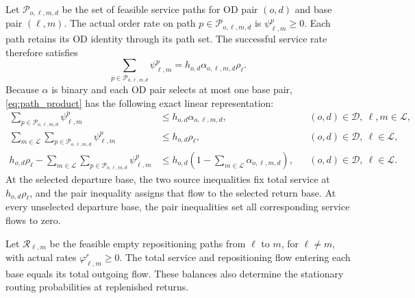 \documentclass[final,3p,authoryear]{elsarticle}
\begin{document}
Let $\mathcal P_{o,\ell,m,d}$ be the set of feasible service paths for OD pair $(o,d)$ and base pair $(\ell,m)$.
The actual order rate on path $p\in\mathcal P_{o,\ell,m,d}$ is $\psi_{\ell,m}^{p}\ge0$.
Each path retains its OD identity through its path set.
The successful service rate therefore satisfies
\begin{equation}
 \sum_{p\in\mathcal P_{o,\ell,m,d}}\psi_{\ell,m}^{p}
 =h_{o,d}\alpha_{o,\ell,m,d}\rho_\ell.
 \label{eq:path_product}
\end{equation}
Because $\alpha$ is binary and each OD pair selects at most one base pair, \eqref{eq:path_product} has the following exact linear representation:
\begin{subequations}\label{eq:path_linearization}
\begin{align}
 \sum_{p\in\mathcal P_{o,\ell,m,d}}\psi_{\ell,m}^{p}
 &\le h_{o,d}\alpha_{o,\ell,m,d},
 &&(o,d)\in\mathcal D,\ \ell,m\in\mathcal L,\label{eq:path_pair}\\
 \sum_{m\in\mathcal L}\sum_{p\in\mathcal P_{o,\ell,m,d}}\psi_{\ell,m}^{p}
 &\le h_{o,d}\rho_\ell,
 &&(o,d)\in\mathcal D,\ \ell\in\mathcal L,\label{eq:path_source_upper}\\
 h_{o,d}\rho_\ell-
 \sum_{m\in\mathcal L}\sum_{p\in\mathcal P_{o,\ell,m,d}}\psi_{\ell,m}^{p}
 &\le h_{o,d}\left(1-\sum_{m\in\mathcal L}\alpha_{o,\ell,m,d}\right),
 &&(o,d)\in\mathcal D,\ \ell\in\mathcal L.\label{eq:path_source_lower}
\end{align}
\end{subequations}
At the selected departure base, the two source inequalities fix total service at $h_{o,d}\rho_\ell$, and the pair inequality assigns that flow to the selected return base.
At every unselected departure base, the pair inequalities set all corresponding service flows to zero.

Let $\mathcal R_{\ell,m}$ be the feasible empty repositioning paths from $\ell$ to $m$, for $\ell\ne m$, with actual rates $\varphi_{\ell,m}^{r}\ge0$.
The total service and repositioning flow entering each base equals its total outgoing flow.
These balances also determine the stationary routing probabilities at replenished returns.
\end{document}
